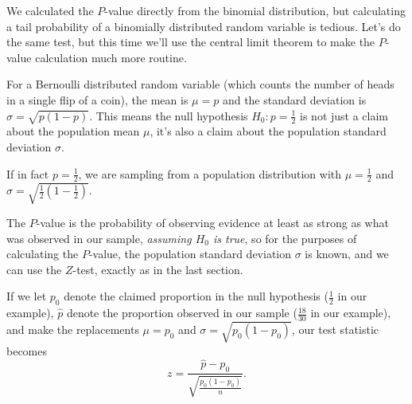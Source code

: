 We calculated the $P$-value directly from the binomial distribution, but calculating a tail probability of a binomially distributed random variable is tedious. Let's do the same test, but this time we'll use the central limit theorem to make the $P$-value calculation much more routine.

For a Bernoulli distributed random variable (which counts the number of heads in a single flip of a coin), the mean is $\mu = p$ and the standard deviation is $\sigma = \sqrt{p(1-p)}$. This means the null hypothesis $H_0: p = \frac{1}{2}$ is not just a claim about the population mean $\mu$, it's also a claim about the population standard deviation $\sigma$.

\begin{keypoint}
If in fact $p = \frac{1}{2}$, we are sampling from a population distribution with $\mu = \frac{1}{2}$ and $\sigma = \sqrt{\frac{1}{2}(1-\frac{1}{2})}$.
\end{keypoint}

The $P$-value is the probability of observing evidence at least as strong as what was observed in our sample, \emph{assuming $H_0$ is true}, so for the purposes of calculating the $P$-value, the population standard deviation $\sigma$ is known, and we can use the $Z$-test, exactly as in the last section. 

If we let $p_0$ denote the claimed proportion in the null hypothesis ($\frac{1}{2}$ in our example), $\widehat{p}$ denote the proportion observed in our sample ($\frac{18}{30}$ in our example), and make the replacements $\mu = p_0$ and $\sigma = \sqrt{p_0(1-p_0)}$, our test statistic becomes
$$z = \frac{\widehat{p} - p_0}{\sqrt{\frac{p_0(1-p_0)}{n}}}.$$

